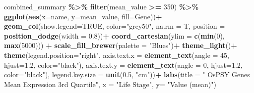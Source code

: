 \documentclass[
]{article}
\newenvironment{Shaded}{\begin{snugshade}}{\end{snugshade}}
\newcommand{\AttributeTok}[1]{\textcolor[rgb]{0.13,0.29,0.53}{#1}}
\newcommand{\ConstantTok}[1]{\textcolor[rgb]{0.56,0.35,0.01}{#1}}
\newcommand{\DecValTok}[1]{\textcolor[rgb]{0.00,0.00,0.81}{#1}}
\newcommand{\FloatTok}[1]{\textcolor[rgb]{0.00,0.00,0.81}{#1}}
\newcommand{\FunctionTok}[1]{\textcolor[rgb]{0.13,0.29,0.53}{\textbf{#1}}}
\newcommand{\NormalTok}[1]{#1}
\newcommand{\SpecialCharTok}[1]{\textcolor[rgb]{0.81,0.36,0.00}{\textbf{#1}}}
\newcommand{\StringTok}[1]{\textcolor[rgb]{0.31,0.60,0.02}{#1}}
\begin{document}
\begin{Shaded}
\begin{Highlighting}[]
\NormalTok{combined\_summary }\SpecialCharTok{\%\textgreater{}\%} 
  \FunctionTok{filter}\NormalTok{(mean\_value }\SpecialCharTok{\textgreater{}=} \DecValTok{350}\NormalTok{) }\SpecialCharTok{\%\textgreater{}\%} 
  \FunctionTok{ggplot}\NormalTok{(}\FunctionTok{aes}\NormalTok{(}\AttributeTok{x=}\NormalTok{name, }\AttributeTok{y=}\NormalTok{mean\_value, }\AttributeTok{fill=}\NormalTok{Gene))}\SpecialCharTok{+}
  \FunctionTok{geom\_col}\NormalTok{(}\AttributeTok{show.legend=}\ConstantTok{TRUE}\NormalTok{, }\AttributeTok{color=}\StringTok{"grey50"}\NormalTok{, }\AttributeTok{na.rm =}\NormalTok{ T, }\AttributeTok{position =} \FunctionTok{position\_dodge}\NormalTok{(}\AttributeTok{width =} \FloatTok{0.8}\NormalTok{))}\SpecialCharTok{+}
  \FunctionTok{coord\_cartesian}\NormalTok{(}\AttributeTok{ylim =} \FunctionTok{c}\NormalTok{(}\FunctionTok{min}\NormalTok{(}\DecValTok{0}\NormalTok{), }\FunctionTok{max}\NormalTok{(}\DecValTok{5000}\NormalTok{))) }\SpecialCharTok{+}
  \FunctionTok{scale\_fill\_brewer}\NormalTok{(}\AttributeTok{palette =} \StringTok{"Blues"}\NormalTok{)}\SpecialCharTok{+}
  \FunctionTok{theme\_light}\NormalTok{()}\SpecialCharTok{+}
  \FunctionTok{theme}\NormalTok{(}\AttributeTok{legend.position=}\StringTok{"right"}\NormalTok{, }
        \AttributeTok{axis.text.x =} \FunctionTok{element\_text}\NormalTok{(}\AttributeTok{angle =} \DecValTok{45}\NormalTok{, }\AttributeTok{hjust=}\FloatTok{1.2}\NormalTok{, }\AttributeTok{color=}\StringTok{"black"}\NormalTok{), }
        \AttributeTok{axis.text.y =} \FunctionTok{element\_text}\NormalTok{(}\AttributeTok{angle =} \DecValTok{0}\NormalTok{, }\AttributeTok{hjust=}\FloatTok{1.2}\NormalTok{, }\AttributeTok{color=}\StringTok{"black"}\NormalTok{), }
        \AttributeTok{legend.key.size =} \FunctionTok{unit}\NormalTok{(}\FloatTok{0.5}\NormalTok{, }\StringTok{"cm"}\NormalTok{))}\SpecialCharTok{+}
  \FunctionTok{labs}\NormalTok{(}\AttributeTok{title =} \StringTok{" OsPSY Genes Mean Expression 3rd Quartile"}\NormalTok{,}
       \AttributeTok{x =} \StringTok{"Life Stage"}\NormalTok{,}
       \AttributeTok{y=} \StringTok{"Value (mean)"}\NormalTok{)}
\end{Highlighting}
\end{Shaded}
\end{document}
